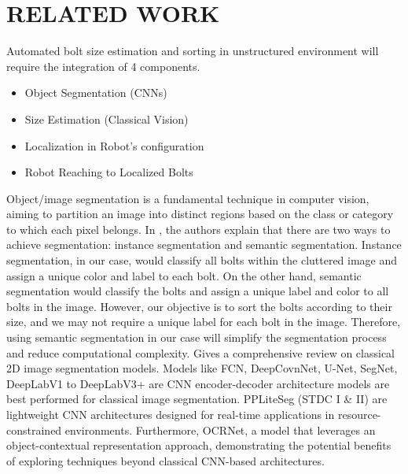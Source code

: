 \documentclass[letterpaper, 10 pt, conference]{ieeeconf}  %
\begin{document}
\section{RELATED WORK}
Automated bolt size estimation and sorting in unstructured environment will require the integration of 4 components.
\begin{itemize}
    \item Object Segmentation (CNNs)
    \item Size Estimation (Classical Vision)
    \item Localization in Robot's configuration
    \item Robot Reaching to Localized Bolts
\end{itemize}

Object/image segmentation is a fundamental technique in computer vision, aiming to partition an image into distinct regions based on the class or category to which each pixel belongs. In \cite{INSVSSEM}, the authors explain that there are two ways to achieve segmentation: instance segmentation and semantic segmentation. Instance segmentation, in our case, would classify all bolts within the cluttered image and assign a unique color and label to each bolt. On the other hand, semantic segmentation would classify the bolts and assign a unique label and color to all bolts in the image. However, our objective is to sort the bolts according to their size, and we may not require a unique label for each bolt in the image. Therefore, using semantic segmentation in our case will simplify the segmentation process and reduce computational complexity. \cite{StateofArtSemanticSegmentation} Gives a comprehensive review on classical 2D image segmentation models. Models like FCN, DeepCovnNet, U-Net, SegNet, DeepLabV1 to DeepLabV3+ \cite{FCN, DeepCOnvNet, U-Net, segnet, DeepLabV1, DeepLabV2, DeepLabV3, DeepLabV3+} are CNN encoder-decoder architecture models are best performed for classical image segmentation. \cite{PPLiteSeg} PPLiteSeg (STDC I \& II) are lightweight CNN architectures designed for real-time applications in resource-constrained environments. Furthermore, \cite{OCRNET} OCRNet, a model that leverages an object-contextual representation approach, demonstrating the potential benefits of exploring techniques beyond classical CNN-based architectures.
 
\end{document}
